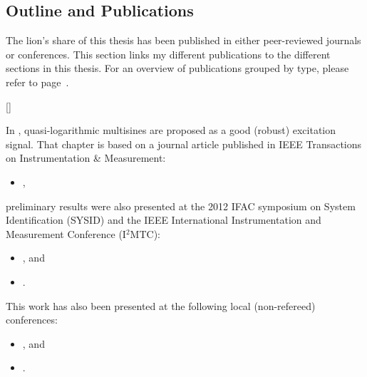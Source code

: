 \subsection{Outline and Publications}
   The lion's share of this thesis has been published in either peer-reviewed  journals or conferences.
   This section links my different publications to the different sections in this thesis.
   For an overview of publications grouped by type, please refer to page~\pageref{publicationList}.

\begin{refsection}

\makeatletter
\DeclareCiteCommand{\fullcite}
  {%
    }
  {\usedriver
     {}
     {}}
  {\multicitedelim}
  {}
\DeclareCiteCommand{\footfullcite}[\mkbibfootnote]
  {%
    }
  {\usedriver
     {}
     {}}
  {\multicitedelim}
  {}
\makeatother


In , quasi-logarithmic multisines are proposed as a good (robust) excitation signal. 
That chapter is based on a journal article published in \gls{IEEE} Transactions on Instrumentation \& Measurement:
\begin{itemize}
  \item {}, 
\end{itemize}
preliminary results were also presented at the 2012 \gls{IFAC} symposium on System Identification (\textsc{SYSID}) and the \gls{IEEE} International Instrumentation and Measurement Conference (\textsc{I$^{\text{2}}$MTC}):
\begin{itemize}
  \item {}, and
  \item {}.
\end{itemize}
This work has also been presented at the following local (non-refereed) conferences:
\begin{itemize}
  \item {}, and
  \item {}.
\end{itemize}


\end{refsection}
